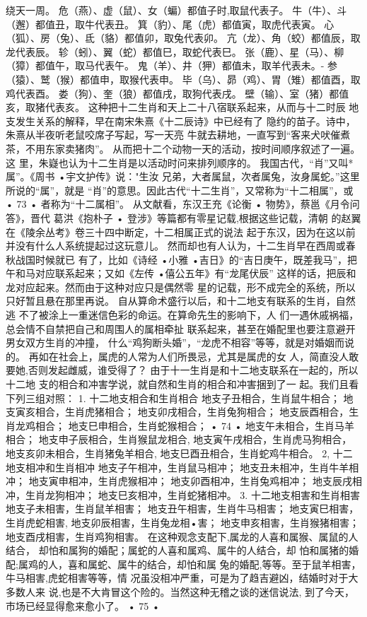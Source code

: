 绕天一周。
危（燕）、虚（鼠）、女（蝙）都值子时,取鼠代表子。
牛（牛）、斗（邂）都值丑，取牛代表丑。
箕（豹）、尾（虎）都值寅，取虎代表寅。
心（狐）、房（兔）、氐（貉）都值卯，取兔代表卯。
亢（龙）、角（蛟）都值辰，取龙代表辰。
轸（蚓）、翼（蛇）都值巳，取蛇代表巳。
张（鹿）、星（马）、柳（獐）都值午，取马代表午。
鬼（羊）、井（狎）都值未，取羊代表未。-
参（猿）、鹫（猴）都值申，取猴代表申。
毕（乌）、昴（鸡）、胃（雉）都值酉，取鸡代表酉。
娄（狗）、奎（狼）都值戌，取狗代表戌。
壁（输）、室（猪）都值亥，取猪代表亥。
这种把十二生肖和天上二十八宿联系起来，从而与十二时辰
地支发生关系的解释，早在南宋朱熹《十二辰诗》中已经有了
隐约的苗子。诗中，朱熹从半夜听老鼠咬席子写起，写一天亮
牛就去耕地，一直写到“客来犬吠催煮茶，不用东家卖猪肉”。
从而把十二个动物一天的活动，按时间顺序叙述了一遍。这
里，朱嶷也认为十二生肖是以活动时问来排列顺序的。
我国古代，“肖”又叫*属”。《周书 •宇文护传》说："生汝
兄弟，大者属鼠，次者属兔，汝身属蛇。”这里所说的“属”，就是
“肖”的意思。因此古代“十二生肖”，又常称为“十二相属”，或
• 73 •
者称为“十二属相”。
从文献看，东汉王充《论衡 • 物势》，蔡邕《月令问答》，晋代
葛洪《抱朴子 • 登涉》等篇都有零星记载,根据这些记载，清朝
的赵翼在《陵余丛考》卷三十四中断定，十二相属正式的说法
起于东汉，因为在这以前并没有什么人系统提起过这玩意儿。
然而却也有人认为，十二生肖早在西周或春秋战国时候就已
有了，比如《诗经 •小雅 •吉日》的“吉日庚午，既差我马”，把
午和马对应联系起来；又如《左传 •僖公五年》有“龙尾伏辰”
这样的话，把辰和龙对应起来。然而由于这种对应只是偶然零
星的记载，形不成完全的系统，所以只好暂且悬在那里再说。
自从算命术盛行以后，和十二地支有联系的生肖，自然逃
不了被涂上一重迷信色彩的命运。在算命先生的影响下，人
们一遇休戚祸福，总会情不自禁把自己和周围人的属相牵扯
联系起来，甚至在婚配里也要注意避开男女双方生肖的冲撞，
什么“鸡狗断头婚”，“龙虎不相容”等等，就是对婚姻而说的。
再如在社会上，属虎的人常为人们所畏忌，尤其是属虎的女
人，简直没人敢要她,否则发起雌威，谁受得了？
由于十一生肖是和十二地支联系在一起的，所以十二地
支的相合和冲害学说，就自然和生肖的相合和冲害捆到了一
起。我们且看下列三组对照：
1. 十二地支相合和生肖相合
地支子丑相合，生肖鼠牛相合；
地支寅亥相合，生肖虎猪相合；
地支卯戌相合，生肖兔狗相合；
地支辰酉相合，生肖龙鸡相合；
地支巳申相合，生肖蛇猴相合；
• 74 •
地支午未相合，生肖马羊相合；
地支申子辰相合，生肖猴鼠龙相合,
地支寅午戌相合，生肖虎马狗相合，
地支亥卯未相合，生肖猪兔羊相合,
地支巳酉丑相合，生肖蛇鸡牛相合。
2, 十二地支相冲和生肖相冲
地支子午相冲，生肖鼠马相冲；
地支丑未相冲，生肖牛羊相冲；
地支寅申相冲，生肖虎猴相冲；
地支卯酉相冲，生肖兔鸡相冲；
地支辰戌相冲，生肖龙狗相冲；
地支巳亥相冲，生肖蛇猪相冲。
3. 十二地支相害和生肖相害
地支子未相害，生肖鼠羊相害；
地支丑午相害，生肖牛马相害；
地支寅巳相害，生肖虎蛇相害,
地支卯辰相害，生肖兔龙相•害；
地支申亥相害，生肖猴猪相害；
地支酉戌相害，生肖鸡狗相害。
在这种观念支配下,属龙的人喜和属猴、属鼠的人结合，
却怕和属狗的婚配；属蛇的人喜和属鸡、属牛的人结合，却
怕和属猪的婚配;属鸡的人，喜和属蛇、属牛的结合，却怕和属
兔的婚配,等等。至于鼠羊相害，牛马相害,虎蛇相害等等，情
况虽没相冲严重，可是为了趋吉避凶，结婚时对于大多数人来
说,也是不大肯冒这个险的。当然这种无稽之谈的迷信说法,
到了今天，市场已经显得愈来愈小了。
• 75 •
